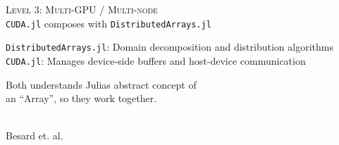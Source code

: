\documentclass[14pt]{beamer}
\def\MyBlue{NavyBlue}
\begin{document}
\begin{frame}
    \centering
    \begin{minipage}[c][.8\textheight][t]{\textwidth}
        \centering
        \textsc{Level 3: Multi-GPU / Multi-node}\\[1em]
        \scriptsize
        \texttt{CUDA.jl} composes with
        \texttt{DistributedArrays.jl}\\[1em]

        \pause
        {\raggedright
        \texttt{DistributedArrays.jl}:
        Domain decomposition and distribution algorithms \\[1em]
        \texttt{CUDA.jl}: Manages device-side
        buffers and host-device communication\\[3em]
        }

        {\color{\MyBlue}Both understands Julias abstract concept of\\ an
        ``Array'', so they work together.}

        \pause
        \vfill
        {\color{gray}{\em Rapid Software Prototyping for
        Heterogeneous and Distributed Platforms}\\ Besard
        et. al.}
    \end{minipage}
\end{frame}
\end{document}
